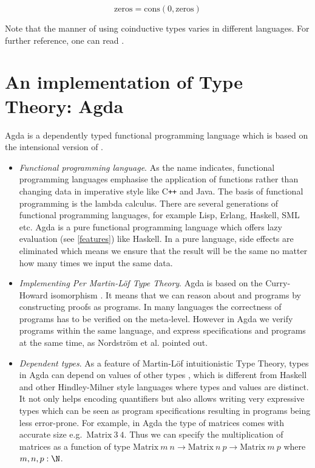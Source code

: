$$\text{zeros} = \text{cons}(0,\text{zeros})$$

Note that the manner of using coinductive types varies in different languages.  For further reference, one can read \cite{DBLP:journals/tcs/Capretta11}.

\section{An implementation of Type Theory: Agda}

Agda is a dependently typed functional programming language which is based on the intensional version
of \mltt \cite{agdawiki:main}. 

\begin{itemize}

\item \textit{Functional programming language}. As the name indicates, functional programming languages emphasise the application of functions rather than changing data in imperative style like C{}\verb!++! and Java. The basis of functional programming is the lambda calculus. There are several generations of functional programming languages, for example Lisp, Erlang, Haskell, SML etc. 
Agda is a pure functional programming language which offers lazy evaluation (see \autoref{features}) like Haskell. In a pure language, side effects are eliminated which means we ensure that the result will be the same no matter how many times we input the same data. 

\item \textit{Implementing Per Martin-L\"{o}f Type Theory}. Agda is based on the Curry-Howard isomorphism \cite{aboa}. It means that we can reason about \maths and programs by constructing proofs as programs. In many languages the correctness of programs has to be verified on the meta-level. However in Agda we verify programs within the same language, and express specifications and  programs at the same time, as Nordström et al. \cite{nor:90} pointed out.


\item \textit{Dependent types}. 
As a feature of Martin-L\"{o}f intuitionistic Type Theory, types in Agda can depend on values of other types \cite{dtw}, which is different from Haskell and other Hindley-Milner style languages where types and values are distinct. It not only helps encoding quantifiers but also allows writing very expressive types which can be seen as program specifications resulting in programs being less error-prone.
For example, in Agda the type of matrices comes with accurate size e.g.\ $\text{Matrix}~3~4$. Thus we can specify the multiplication of matrices as a function of type $\text{Matrix}~m~n \to \text{Matrix}~n~p \to \text{Matrix}~m~p$ where $m,n,p : \N$. 
\end{itemize}


